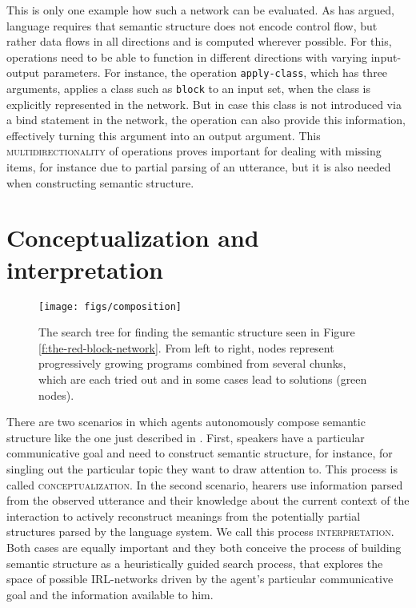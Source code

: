 This is only one example how such a network can be evaluated. 
As \cite{steels2000emergence} has argued,
language requires that semantic structure does not encode control flow, but rather 
data flows in all directions and is computed wherever possible.
For this, operations need to be able to function in different directions with
varying input-output parameters.
For instance, the operation {\footnotesize\tt apply-class}, which has three arguments, 
applies a class such as {\footnotesize\tt block} to an input set, when the 
class is explicitly represented in the network. But in case
this class is not introduced via a bind statement in the network, the operation
can also provide this information, effectively turning this argument
into an output argument. This \textsc{multidirectionality} of operations 
proves important for dealing with missing items, for instance due to partial parsing 
of an utterance, but it is also needed when constructing semantic structure.


\section{Conceptualization and interpretation}
\begin{figure}
\center
\texttt{[image: figs/composition]}
\caption[IRL conceptualization search tree]{The search tree 
for finding the semantic structure seen in 
Figure \ref{f:the-red-block-network}. From left to right, nodes 
represent progressively growing programs combined from 
several chunks, which are each tried out and in some cases 
lead to solutions (green nodes).}
\label{f:the-red-block-search-tree}
\end{figure}

There are two scenarios in which agents autonomously compose semantic
structure like the one just described in . 
First, speakers have a particular communicative goal and need to construct 
semantic structure, for instance, for singling out the particular topic they
want to draw attention to.
This process is called \textsc{conceptualization}. In the second scenario, 
hearers use information parsed from the observed utterance and their 
knowledge about the current context of the interaction to 
actively reconstruct meanings from the potentially partial 
structures parsed by the language system. We call this process 
\textsc{interpretation}. Both cases are equally important and
they both conceive the process of building semantic structure as a heuristically
guided search process, that explores the space of possible IRL-networks 
driven by the agent's particular communicative goal and the information
available to him.

